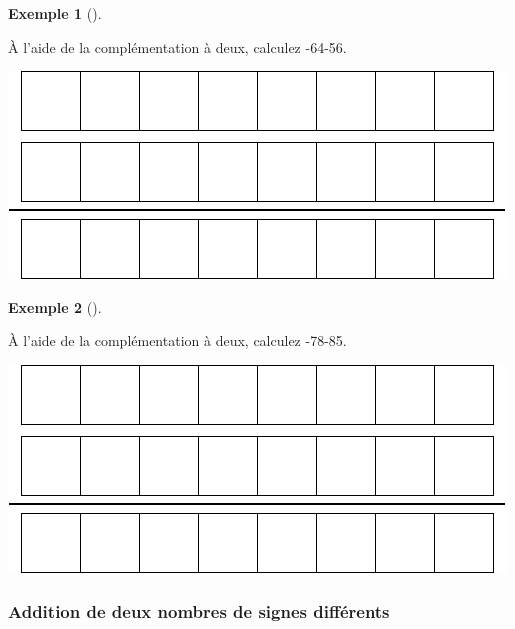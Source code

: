 \documentclass[
  letterpaper,
]{scrbook}
\theoremstyle{plain}
\theoremstyle{definition}
\newtheorem{example}{Exemple}[chapter]
\theoremstyle{definition}
\theoremstyle{remark}
\begin{document}
\leavevmode{}%
\begin{example}[]\label{exm-addition-complement-deux-3}

À l'aide de la complémentation à deux, calculez -64-56.

\includegraphics{./systeme_numeration_files/figure-pdf/unnamed-chunk-10-1.pdf}

\end{example}

\leavevmode{}%
\begin{example}[]\label{exm-addition-complement-deux-4}

À l'aide de la complémentation à deux, calculez -78-85.

\includegraphics{./systeme_numeration_files/figure-pdf/unnamed-chunk-11-1.pdf}

\end{example}

\hypertarget{addition-de-deux-nombres-de-signes-diffuxe9rents}{%
\subsubsection*{Addition de deux nombres de signes
différents}\label{addition-de-deux-nombres-de-signes-diffuxe9rents}}
\end{document}
